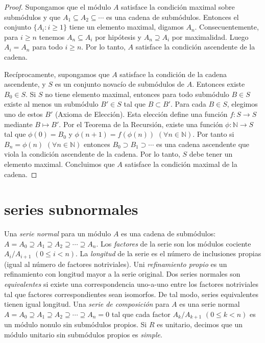 \documentclass{report}
\newcommand{\naturalNumbers}{\mathbb{N}}
\begin{document}
  \begin{proof}
    Supongamos que el módulo \(A\) satisface la condición maximal sobre submódulos y que \(A_1 \subseteq A_2 \subseteq \cdots\) es una cadena de submódulos.
    Entonces el conjunto \(\{A_i : i \geq 1\}\) tiene un elemento maximal, digamos \(A_n\).
    Consecuentemente, para \(i \geq n\) tenemos \(A_n \subseteq A_i\) por hipótesis y \(A_n \supseteq A_i\) por maximalidad.
    Luego \(A_i = A_n\) para todo \(i \geq n\).
    Por lo tanto, \(A\) satisface la condición ascendente de la cadena.

    Recíprocamente, supongamos que \(A\) satisface la condición de la cadena ascendente, y \(S\) es un conjunto novacío de submódulos de \(A\).
    Entonces existe \(B_0 \in S\).
    Si \(S\) no tiene elemento maximal, entonces para todo submódulo \(B \in S\) existe al menos un submódulo \(B' \in S\) tal que \(B \subset B'\).
    Para cada \(B \in S\), elegimos uno de estos \(B'\) (Axioma de Elección).
    Esta elección define una función \(f : S \rightarrow S\) mediante \(B \mapsto B'\).
    Por el Teorema de la Recursión, existe una función \(\phi : \naturalNumbers \rightarrow S\) tal que \(\phi(0) = B_0\) y \(\phi(n + 1) = f(\phi(n))\) \((\forall n \in \naturalNumbers)\).
    Por tanto si \(B_n = \phi(n)\) \((\forall n \in \naturalNumbers)\) entonces \(B_0 \supset B_1 \supset \cdots\) es una cadena ascendente que viola la condición ascendente de la cadena.
    Por lo tanto, \(S\) debe tener un elemento maximal.
    Concluimos que \(A\) satisface la condición maximal de la cadena.
  \end{proof}

  \section{series subnormales}

  Una \emph{serie normal} para un módulo \(A\) es una cadena de submódulos:
  \(A = A_0 \supseteq A_1 \supseteq A_2 \supseteq \cdots \supseteq A_n\).
  Los \emph{factores} de la serie son los módulos cociente \(A_i / A_{i + 1}\) \((0 \leq i < n)\).
  La \emph{longitud} de la serie es el número de inclusiones propias (igual al número de factores notriviales).
  Uni \emph{refinamiento propio} es un refinamiento con longitud mayor a la serie original.
  Dos series normales son \emph{equivalentes} si existe una correspondencia uno-a-uno entre los factores notriviales tal que factores correspondientes sean isomorfos.
  De tal modo, series equivalentes tienen igual longitud.
  Una \emph{serie de composición} para \(A\) es una serie normal
  \(A = A_0 \supseteq A_1 \supseteq A_2 \supseteq \cdots \supseteq A_n = 0\)
  tal que cada factor \(A_k / A_{k + 1}\) \((0 \leq k < n)\) es un módulo nonulo sin submódulos propios.
  Si \(R\) es unitario, decimos que un módulo unitario sin submódulos propios es \emph{simple}.
\end{document}
